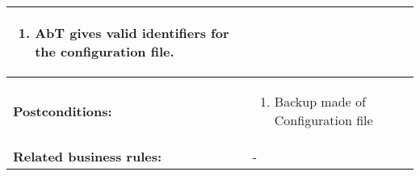 \begin{tabularx}{\linewidth}{|l|X|}
\begin{enumerate}
							\item AbT gives valid identifiers for the configuration file.
						\end{enumerate} \\
\hline
\textbf{Postconditions:} & 
  \begin{minipage}{\linewidth}
  \vspace{0.05em}
  \begin{enumerate}
    \item Backup made of Configuration file
  \end{enumerate}
  \vspace{0.05em}
\end{minipage}
\\
\hline
\textbf{Related business rules:} & - \\
\hline
\end{tabularx}


